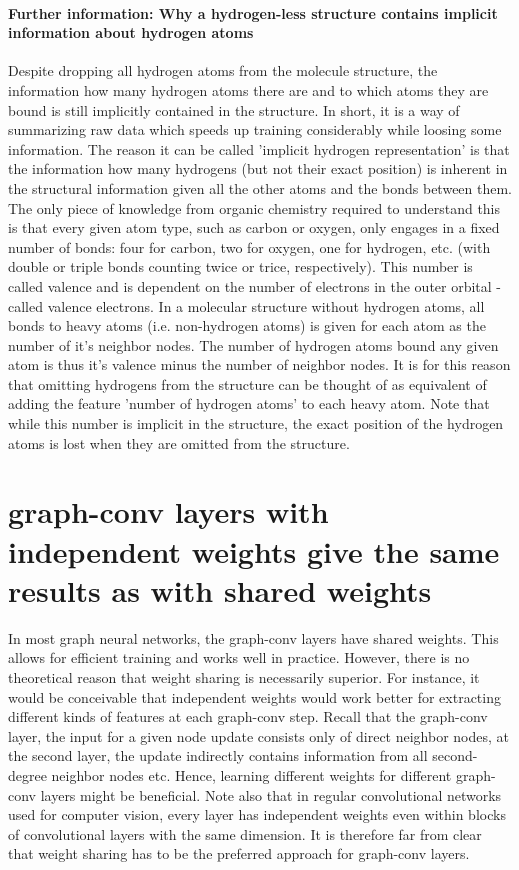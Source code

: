 \paragraph{Further information: Why a hydrogen-less structure contains implicit information about hydrogen atoms}
Despite dropping all hydrogen atoms from the molecule structure, the information how many hydrogen atoms there are and to which atoms they are bound is still implicitly contained in the structure. In short, it is a way of summarizing raw data which speeds up training considerably while loosing some information. The reason it can be called 'implicit hydrogen representation' is that the information how many hydrogens (but not their exact position) is inherent in the structural information given all the other atoms and the bonds between them. The only piece of knowledge from organic chemistry required to understand this is that every given atom type, such as carbon or oxygen, only engages in a fixed number of bonds: four for carbon, two for oxygen, one for hydrogen, etc. (with double or triple bonds counting twice or trice, respectively). This number is called valence and is dependent on the number of electrons in the outer orbital - called valence electrons. In a molecular structure without hydrogen atoms, all bonds to heavy atoms (i.e. non-hydrogen atoms) is given for each atom as the number of it's neighbor nodes. The number of hydrogen atoms bound any given atom is thus it's valence minus the number of neighbor nodes. It is for this reason that omitting hydrogens from the structure can be thought of as equivalent of adding the feature 'number of hydrogen atoms' to each heavy atom. Note that while this number is implicit in the structure, the exact position of the hydrogen atoms is lost when they are omitted from the structure.



\section{graph-conv layers with independent weights give the same results as with shared weights}


In most graph neural networks, the graph-conv layers have shared weights. This allows for efficient training and works well in practice. However, there is no theoretical reason that weight sharing is necessarily superior. For instance, it would be conceivable that independent weights would work better for extracting different kinds of features at each graph-conv step. Recall that the graph-conv layer, the input for a given node update consists only of direct neighbor nodes, at the second layer, the update indirectly contains information from all second-degree neighbor nodes etc. Hence, learning different weights for different graph-conv layers might be beneficial. Note also that in regular convolutional networks used for computer vision, every layer has independent weights even within blocks of convolutional layers with the same dimension. It is therefore far from clear that weight sharing has to be the preferred approach for graph-conv layers.

